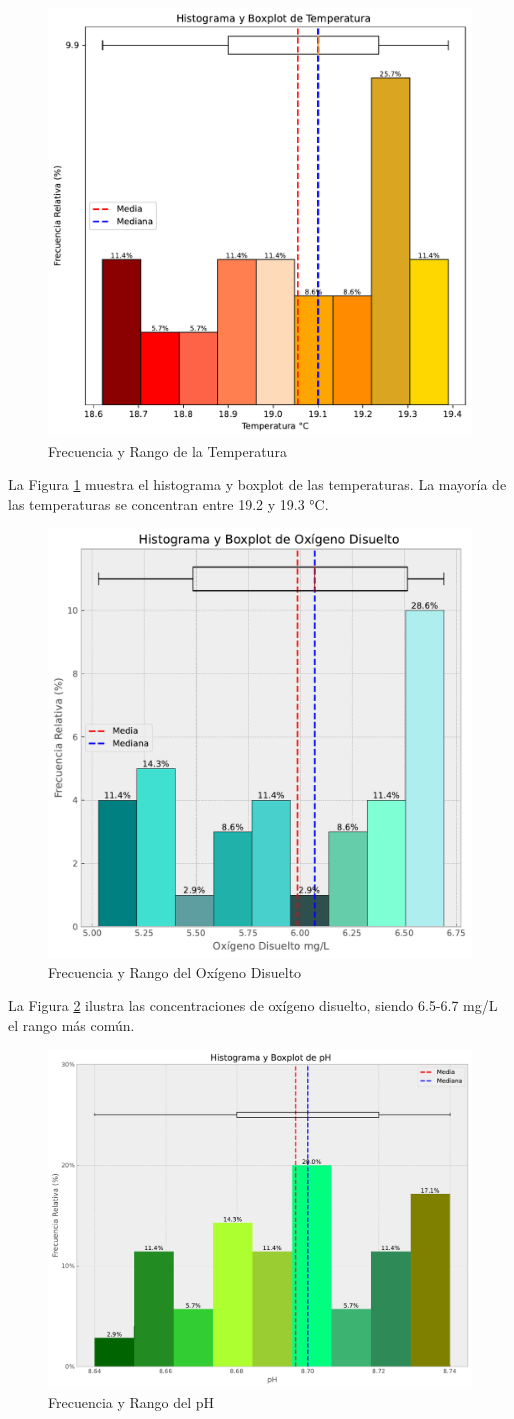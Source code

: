 \begin{figure}[!htb]
    \centering
    \includegraphics[width=0.5\linewidth]{Figuras_AED/Histograma_Temperatura.pdf}
    \caption{Frecuencia y Rango de la Temperatura}
    \label{fig:enter-label1}
\end{figure}

La Figura \ref{fig:enter-label1} muestra el histograma y boxplot de las temperaturas. La mayoría de las temperaturas se concentran entre 19.2 y 19.3 °C. 

\begin{figure}[!htb]
    \centering
    \includegraphics[width=0.5\linewidth]{Figuras_AED/Histograma_Oxigeno_Disuelto.pdf}
    \caption{Frecuencia y Rango del Oxígeno Disuelto}
    \label{fig:enter-label2}
\end{figure}

La Figura \ref{fig:enter-label2} ilustra las concentraciones de oxígeno disuelto, siendo 6.5-6.7 mg/L el rango más común.

\begin{figure}[!htb]
    \centering
    \includegraphics[width=0.5\linewidth]{Figuras_AED/Histograma_pH.pdf}
    \caption{Frecuencia y Rango del pH}
    \label{fig:enter-label4}
\end{figure}

